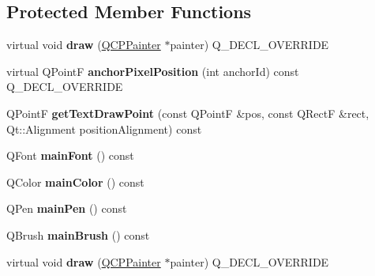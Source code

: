 \subsection*{Protected Member Functions}
\begin{DoxyCompactItemize}
\item 
\mbox{\label{class_q_c_p_item_text_a8f8f075da83b6547c2b32e1f64cf0554}} 
virtual void {\bfseries draw} (\hyperlink{class_q_c_p_painter}{Q\+C\+P\+Painter} $\ast$painter) Q\+\_\+\+D\+E\+C\+L\+\_\+\+O\+V\+E\+R\+R\+I\+DE
\item 
\mbox{\label{class_q_c_p_item_text_afcdb1724d88d561f65da95fb54b0acb7}} 
virtual Q\+PointF {\bfseries anchor\+Pixel\+Position} (int anchor\+Id) const Q\+\_\+\+D\+E\+C\+L\+\_\+\+O\+V\+E\+R\+R\+I\+DE
\item 
\mbox{\label{class_q_c_p_item_text_a4c76ad7e33c50aff0a60b8f38fe6060e}} 
Q\+PointF {\bfseries get\+Text\+Draw\+Point} (const Q\+PointF \&pos, const Q\+RectF \&rect, Qt\+::\+Alignment position\+Alignment) const
\item 
\mbox{\label{class_q_c_p_item_text_af30ac2a0b84afa86a1dec22ab48dd07d}} 
Q\+Font {\bfseries main\+Font} () const
\item 
\mbox{\label{class_q_c_p_item_text_abe3f10805baf62797cb91fd4a4464fcc}} 
Q\+Color {\bfseries main\+Color} () const
\item 
\mbox{\label{class_q_c_p_item_text_a2f67fcbb7ac10ea9a94c4ecc3b0f4dfc}} 
Q\+Pen {\bfseries main\+Pen} () const
\item 
\mbox{\label{class_q_c_p_item_text_acddddd3ce88cfc87ab57b1ec4b25acb9}} 
Q\+Brush {\bfseries main\+Brush} () const
\item 
\mbox{\label{class_q_c_p_item_text_a02580ee5d7172e19a0178717edb9f79e}} 
virtual void {\bfseries draw} (\hyperlink{class_q_c_p_painter}{Q\+C\+P\+Painter} $\ast$painter) Q\+\_\+\+D\+E\+C\+L\+\_\+\+O\+V\+E\+R\+R\+I\+DE
\item 
\mbox{\label{class_q_c_p_item_text_a383963bea5a2e7b27759b0115d3d5c36}} 

\end{DoxyCompactItemize}

